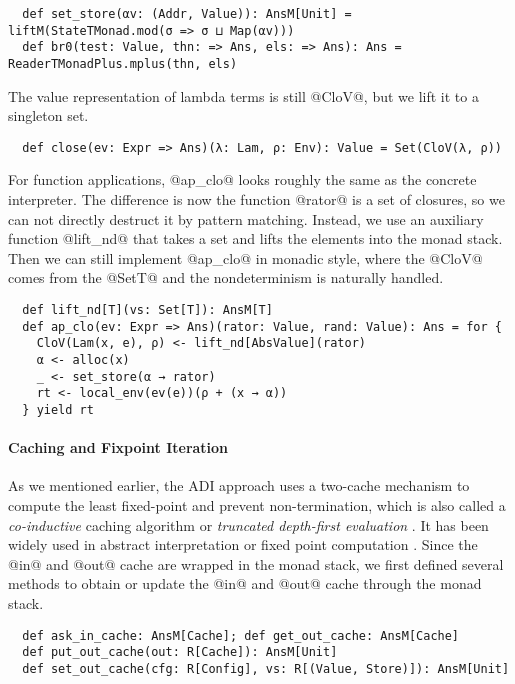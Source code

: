 \begin{lstlisting}
  def set_store(αv: (Addr, Value)): AnsM[Unit] = liftM(StateTMonad.mod(σ => σ ⊔ Map(αv)))
  def br0(test: Value, thn: => Ans, els: => Ans): Ans = ReaderTMonadPlus.mplus(thn, els)
\end{lstlisting}

The value representation of lambda terms is still @CloV@, but we lift it to a
singleton set.

\begin{lstlisting}
  def close(ev: Expr => Ans)(λ: Lam, ρ: Env): Value = Set(CloV(λ, ρ))
\end{lstlisting}

For function applications, @ap_clo@ looks roughly the same as the concrete
interpreter. The difference is now the function @rator@ is a set of closures, so
we can not directly destruct it by pattern matching. Instead, we use an
auxiliary function @lift_nd@ that takes a set and lifts the elements into the
monad stack. Then we can still implement @ap_clo@ in monadic style, where the
@CloV@ comes from the @SetT@ and the nondeterminism is naturally handled.

\begin{lstlisting}
  def lift_nd[T](vs: Set[T]): AnsM[T]
  def ap_clo(ev: Expr => Ans)(rator: Value, rand: Value): Ans = for {
    CloV(Lam(x, e), ρ) <- lift_nd[AbsValue](rator)
    α <- alloc(x)
    _ <- set_store(α → rator)
    rt <- local_env(ev(e))(ρ + (x → α))
  } yield rt
\end{lstlisting}


\paragraph{Caching and Fixpoint Iteration}

As we mentioned earlier, the ADI approach uses a two-cache mechanism to
compute the least fixed-point and prevent non-termination, which is also called a
\textit{co-inductive} caching algorithm or \textit{truncated depth-first
evaluation} \cite{Rosendahl:AbsIntPL}. It has been widely used in abstract
interpretation or fixed point computation
\cite{DBLP:journals/pacmpl/DaraisLNH17, Wei:2018:RAA:3243631.3236800,
Rosendahl:AbsIntPL}. Since the @in@ and @out@ cache are wrapped in the monad
stack, we first defined several methods to obtain or update the @in@ and @out@
cache through the monad stack.

\begin{lstlisting}
  def ask_in_cache: AnsM[Cache]; def get_out_cache: AnsM[Cache]
  def put_out_cache(out: R[Cache]): AnsM[Unit]
  def set_out_cache(cfg: R[Config], vs: R[(Value, Store)]): AnsM[Unit]
\end{lstlisting}

